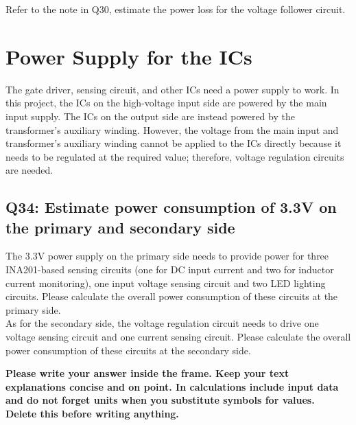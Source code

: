 \documentclass{PELsmallreport}
\begin{document}
Refer to the note in Q30, estimate the power loss for the voltage follower circuit.\\
 \quad \hfill{}

\newpage

\section{Power Supply for the ICs}
The gate driver, sensing circuit, and other ICs need a power supply to work. 
In this project, the ICs on the high-voltage input side are powered by the main input supply. The ICs on the output side are instead powered by the transformer's auxiliary winding. However, the voltage from the main input and transformer's auxiliary winding cannot be applied to the ICs directly because it needs to be regulated at the required value; therefore, voltage regulation circuits are needed.

\subsection{Q34: Estimate power consumption of 3.3V on the primary and secondary side}
The 3.3V power supply on the primary side needs to provide power for three INA201-based sensing circuits (one for DC input current and two for inductor current monitoring), one input voltage sensing circuit and two LED lighting circuits. Please calculate the overall power consumption of these circuits at the primary side. \\

As for the secondary side, the voltage regulation circuit needs to drive one voltage sensing circuit and one current sensing circuit.  Please calculate the overall power consumption of these circuits at the secondary side.
\begin{framed}
	\vspace{2em}
	\textbf{Please write your answer inside the frame. Keep your text explanations concise and on point. In calculations include input data and do not forget units when you substitute symbols for values. \\ Delete this before writing anything.}
	\vspace{2em}
\end{framed}

 \quad {} \quad \hfill{}
\end{document}
